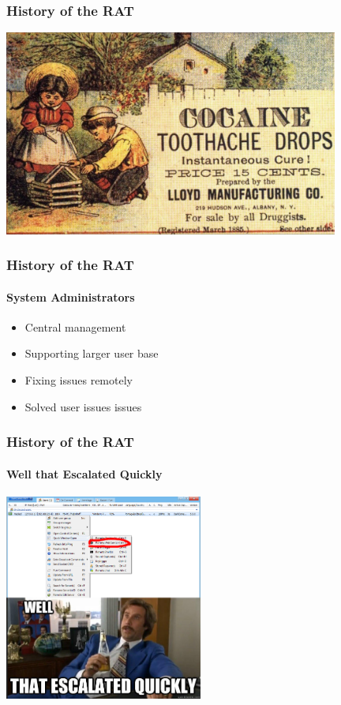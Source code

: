 \documentclass[aspectratio=169]{beamer}
\begin{document}
\begin{frame}
  \frametitle{History of the RAT}
  \begin{center}
    \includegraphics[width=11cm,keepaspectratio]{history}
  \end{center}
\end{frame}

\begin{frame}
  \frametitle{History of the RAT}
  \framesubtitle{System Administrators}
  \begin{itemize}
  \item{Central management}
  \item{Supporting larger user base}
  \item{Fixing issues remotely}
  \item{Solved user issues issues}
  \end{itemize}
\end{frame}

\begin{frame}
  \frametitle{History of the RAT}
  \framesubtitle{Well that Escalated Quickly}
  \begin{center}
    \includegraphics[width=6.5cm,keepaspectratio]{escalated_quickly_rat}
  \end{center}
\end{frame}
\end{document}
